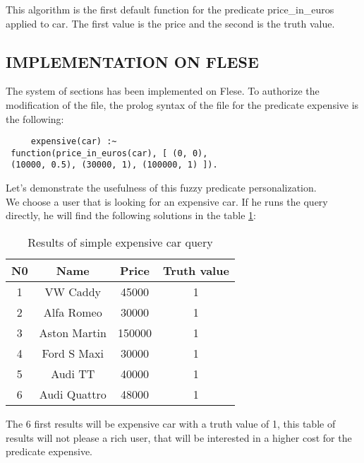 \documentclass[a4paper,twoside]{article}
\begin{document}
This algorithm is the first default function for the predicate price\_in\_euros applied to car. The first value is the price and the second is the truth value. \\

\subsection{\uppercase{Implementation on Flese}}

The system of sections has been implemented on Flese. 
To authorize the modification of the file, the prolog syntax of the file for the predicate expensive is the following:

\begin{small}
\begin{verbatim}
     expensive(car) :~
 function(price_in_euros(car), [ (0, 0),
 (10000, 0.5), (30000, 1), (100000, 1) ]).
\end{verbatim}
\end{small}

Let's demonstrate the usefulness of this fuzzy predicate personalization. \\
 We choose a user that is looking for an expensive car. If he runs the query directly, he will find the following solutions in the table \ref{tab:simpleQuery1}: \\

\begin{table}[h]
\caption{Results of simple expensive car query}\label{tab:simpleQuery1} \centering
\begin{tabular}{|c|c|c|c|}
  \hline
  N0 & Name & Price & Truth value\\
  \hline
  1 & VW Caddy & 45000 & 1\\
  \hline
  2 & Alfa Romeo & 30000 & 1 \\
  \hline
  3 & Aston Martin & 150000 & 1 \\
  \hline
  4 & Ford S Maxi & 30000 & 1 \\
  \hline
  5 & Audi TT & 40000 & 1 \\
  \hline
  6 & Audi Quattro & 48000 & 1 \\ 
  \hline
\end{tabular}
\end{table}

The 6 first results will be expensive car with a truth value of 1, this table of results will not please a rich user, that will be interested in a higher cost for the predicate expensive. \\
\end{document}
